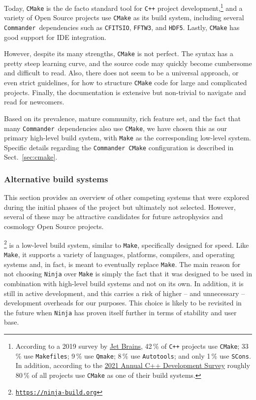 \documentclass[twocolumn]{openjournal}
\def\commander{\texttt{Commander}}
\begin{document}
Today, \texttt{CMake} is the de facto standard tool for \texttt{C++} project
development,\footnote{According to a 2019 survey by
\href{https://www.jetbrains.com/lp/devecosystem-2019/cpp/} {Jet Brains}, 42\,\%
of \texttt{C++} projects use \texttt{CMake}; 33\,\% use \texttt{Makefiles};
9\,\% use \texttt{Qmake}; 8\,\% use \texttt{Autotools}; and only 1\,\% use
\texttt{SCons}. In addition, according to the
\href{https://isocpp.org/blog/2021/04/results-summary-2021-annual-cpp-developer-survey-lite}{2021
Annual C++ Development Survey} roughly 80\,\% of all projects use
\texttt{CMake} as one of their build systems.} and a variety of Open Source
projects use \texttt{CMake} as its build system, including several \commander\
dependencies such as \texttt{CFITSIO}, \texttt{FFTW3}, and \texttt{HDF5}.
Lastly, \texttt{CMake} has good support for IDE integration.

However, despite its many strengths, \texttt{CMake} is not perfect. The syntax
has a pretty steep learning curve, and the source code may quickly become
cumbersome and difficult to read. Also, there does not seem to be a universal
approach, or even strict guidelines, for how to structure \texttt{CMake} code
for large and complicated projects. Finally, the documentation is extensive but
non-trivial to navigate and read for newcomers.

Based on its prevalence, mature community, rich feature set, and the fact that
many \commander\ dependencies also use \texttt{CMake}, we have chosen this as
our primary high-level build system, with \texttt{Make} as the corresponding
low-level system. Specific details regarding the \commander\ \texttt{CMake}
configuration is described in Sect.~\ref{sec:cmake}.

\subsubsection{Alternative build systems}

This section provides an overview of other competing systems that were explored
during the initial phases of the project but ultimately not selected. However,
several of these may be attractive candidates for future astrophysics and
cosmology Open Source projects.

\footnote{\href{https://ninja-build.org}{\texttt{https://ninja-build.org}}}
is a low-level build system, similar to \texttt{Make}, specifically designed
for speed. Like \texttt{Make}, it supports a variety of languages, platforms,
compilers, and operating systems and, in fact, is meant to eventually replace
\texttt{Make}. The main reason for not choosing \texttt{Ninja} over
\texttt{Make} is simply the fact that it was designed to be used in combination
with high-level build systems and not on its own. In addition, it is still in
active development, and this carries a risk of higher -- and unnecessary --
development overheads for our purposes. This choice is likely to be revisited
in the future when \texttt{Ninja} has proven itself further in terms of
stability and user base.
\end{document}
